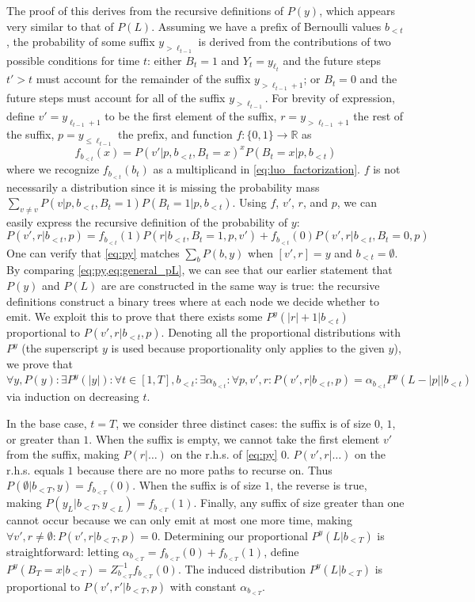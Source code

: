 \documentclass{article}
\begin{document}
The proof of this derives from the recursive definitions of $P(y)$, which
appears very similar to that of $P(L)$. Assuming we have a prefix of Bernoulli
values $b_{<t}$, the probability of some suffix $y_{>\ell_{t-1}}$ is derived
from the contributions of two possible conditions for time $t$: either $B_t =
1$ and $Y_t = y_{\ell_t}$ and the future steps $t' > t$ must account for the
remainder of the suffix $y_{>\ell_{t - 1} + 1}$; or $B_t = 0$ and the future
steps must account for all of the suffix $y_{>\ell_{t-1}}$. For brevity of
expression, define $v' = y_{\ell_{t-1} + 1}$ to be the first element of the
suffix, $r = y_{>\ell_{t-1} + 1}$ the rest of the suffix, $p = y_{\leq
\ell_{t-1}}$ the prefix, and function $f : \{0, 1\} \to \mathbb{R}$ as
%
\begin{equation} \label{eq:f}
    f_{b_{<t}}(x) = P(v'|p, b_{<t}, B_t=x)^x P(B_t=x|p, b_{<t})
\end{equation}
%
where we recognize $f_{b_{<t}}(b_t)$ as a multiplicand in
\cref{eq:luo_factorization}. $f$ is not necessarily a distribution since it is
missing the probability mass $\sum_{v \neq v} P(v|p, b_{<t}, B_t=1) P(B_t=1|p,
b_{<t})$. Using $f$, $v'$, $r$, and $p$, we can easily express the recursive
definition of the probability of $y$:
%
\begin{equation} \label{eq:py}
    P(v', r|b_{<t}, p) = f_{b_{<t}}(1)P(r|b_{<t},B_t=1,p,v') +
                         f_{b_{<t}}(0)P(v', r|b_{<t},B_t=0,p)
\end{equation}
%
One can verify that \cref{eq:py} matches $\sum_b P(b, y)$ when $[v', r] = y$
and $b_{<t} = \emptyset$. By comparing \cref{eq:py,eq:general_pL}, we can see
that our earlier statement that $P(y)$ and $P(L)$ are are constructed in the
same way is true: the recursive definitions construct a binary trees where at
each node we decide whether to emit. We exploit this to prove that there exists
some $P^y(|r|+1|b_{<t})$ proportional to $P(v', r|b_{<t}, p)$. Denoting all the
proportional distributions with $P^y$ (the superscript $y$ is used because
proportionality only applies to the given $y$), we prove that $\forall y, P(y)
: \exists P^y(|y|) : \forall t \in [1, T], b_{<t} : \exists \alpha_{b_{<t}} :
\forall p, v', r : P(v',r|b_{<t}, p) = \alpha_{b_{<t}} P^y(L - |p||b_{<t})$ via
induction on decreasing $t$.

In the base case, $t=T$, we consider three distinct cases: the suffix is of
size $0$, $1$, or greater than $1$. When the suffix is empty, we cannot take
the first element $v'$ from the suffix, making $P(r|\ldots)$ on the r.h.s. of
\cref{eq:py} $0$. $P(v', r|\ldots)$ on the r.h.s. equals $1$ because there are
no more paths to recurse on. Thus $P(\emptyset|b_{<T}, y) = f_{b_{<T}}(0)$.
When the suffix is of size $1$, the reverse is true, making $P(y_L|b_{<T},
y_{<L}) = f_{b_{<T}}(1)$. Finally, any suffix of size greater than one cannot
occur because we can only emit at most one more time, making $\forall v',r \neq
\emptyset: P(v',r|b_{<T}, p) = 0$. Determining our proportional $P^y(L|b_{<T})$
is straightforward: letting $\alpha_{b_{<T}} = f_{b_{<T}}(0) + f_{b_{<T}}(1)$,
define $P^y(B_T=x|b_{<T}) = Z_{b_{<T}}^{-1} f_{b_{<T}}(0)$. The induced
distribution $P^y(L|b_{<T})$ is proportional to $P(v', r'|b_{<T}, p)$ with
constant $\alpha_{b_{<T}}$.
\end{document}
